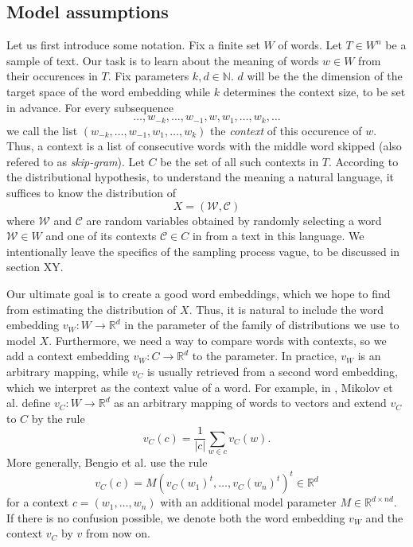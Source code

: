 \documentclass{amsart}
\theoremstyle{plain}
\theoremstyle{definition}
\newcommand{\R}{\mathbb{R}}
\newcommand{\N}{\mathbb{N}}
\begin{document}
\subsection{Model assumptions}
\label{subsec:model}
Let us first introduce some notation.
Fix a finite set $W$ of words.
Let $T \in W^n$ be a sample of text.
Our task is to learn about the meaning of words $w \in W$ from their occurences in $T$.
Fix parameters $k, d \in \N$.
$d$ will be the the dimension of the target space of the word embedding while $k$ determines the context size, to be set in advance.
For every subsequence
\begin{equation*}
  \dots, w_{-k}, \dots, w_{-1}, w, w_1, \dots, w_k, \dots
\end{equation*}
we call the list $(w_{-k}, \dots, w_{-1}, w_1, \dots, w_k)$ the \emph{context} of this occurence of $w$.
Thus, a context is a list of consecutive words with the middle word skipped (also refered to as \emph{skip-gram}).
Let $C$ be the set of all such contexts in $T$.
According to the distributional hypothesis, to understand the meaning a natural language, it suffices to know the distribution of
\begin{equation*}
  \label{eq:cond-expectation}
  X = (\mathcal{W}, \mathcal{C})
\end{equation*}
where $\mathcal{W}$ and $\mathcal{C}$ are random variables obtained by randomly selecting a word $\mathcal{W} \in W$ and one of its contexts $\mathcal{C} \in C$ in from a text in this language.
We intentionally leave the specifics of the sampling process vague, to be discussed in section XY.

Our ultimate goal is to create a good word embeddings, which we hope to find from estimating the distribution of $X$.
Thus, it is natural to include the word embedding $v_W : W \rightarrow \R^d$ in the parameter of the family of distributions we use to model $X$.
Furthermore, we need a way to compare words with contexts, so we add a context embedding $v_W : C \rightarrow \R^d$ to the parameter.
In practice, $v_W$ is an arbitrary mapping, while $v_C$ is usually retrieved from a second word embedding, which we interpret as the context value of a word.
For example, in \cite{DBLP:journals/corr/abs-1301-3781}, Mikolov et al. define $v_C : W \rightarrow \R^d$ as an arbitrary mapping of words to vectors and extend $v_C$ to $C$ by the rule
\begin{equation*}
  v_C(c) = \frac{1}{|c|} \sum_{w \in c} v_C(w).
\end{equation*}
More generally, Bengio et al. use the rule
\begin{equation*}
  v_C(c) = M (v_C(w_1)^t, \dots, v_C(w_n)^t)^t \in \R^d
\end{equation*}
for a context $c = (w_1, \dots, w_n)$ with an additional model parameter $M \in \R^{d \times n d}$.
If there is no confusion possible, we denote both the word embedding $v_W$ and the context $v_C$ by $v$ from now on.
\end{document}
